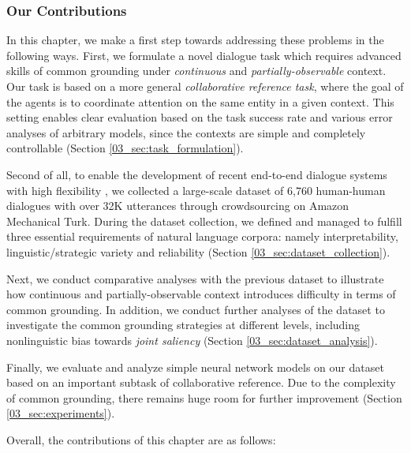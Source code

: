 \subsubsection{Our Contributions}

In this chapter, we make a first step towards addressing these problems in the following ways. First, we formulate a novel dialogue task which requires advanced skills of common grounding under \emph{continuous} and \emph{partially-observable} context. Our task is based on a more general \emph{collaborative reference task}, where the goal of the agents is to coordinate attention on the same entity in a given context. This setting enables clear evaluation based on the task success rate and various error analyses of arbitrary models, since the contexts are simple and completely controllable (Section \ref{03_sec:task_formulation}).

Second of all, to enable the development of recent end-to-end dialogue systems with high flexibility \citep{bordes2017learning,lewis-etal-2017-deal}, we collected a large-scale dataset of 6,760 human-human dialogues with over 32K utterances through crowdsourcing on Amazon Mechanical Turk. During the dataset collection, we defined and managed to fulfill three essential requirements of natural language corpora: namely interpretability, linguistic/strategic variety and reliability (Section \ref{03_sec:dataset_collection}).

Next, we conduct comparative analyses with the previous dataset to illustrate how continuous and partially-observable context introduces difficulty in terms of common grounding. In addition, we conduct further analyses of the dataset to investigate the common grounding strategies at different levels, including nonlinguistic bias towards \emph{joint saliency} (Section \ref{03_sec:dataset_analysis}).

Finally, we evaluate and analyze simple neural network models on our dataset based on an important subtask of collaborative reference. Due to the complexity of common grounding, there remains huge room for further improvement (Section \ref{03_sec:experiments}).

Overall, the contributions of this chapter are as follows:

